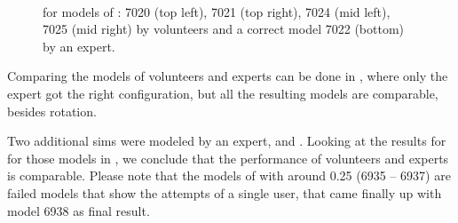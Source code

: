 \begin{figure}
  \centering
   \\
  \caption{\kenc for models of : 7020 (top left), 7021 (top right), 7024 (mid left), 7025 (mid right) by volunteers and a correct model 7022 (bottom) by an expert.}
  \label{fig:kapenc_compare_faulty}
\end{figure}

Comparing the models of volunteers and experts can be done in , where only the
expert got the right configuration, but all the resulting models are comparable, besides rotation.

Two additional sims were modeled by an expert,  and .
Looking at the results for \gEr for those models in , we conclude that the performance of volunteers and experts is comparable.
Please note that the models of  with  around 0.25 (6935 -- 6937) are failed models that show the attempts of a single user, that came finally up with model 6938 as final result.

\clearpage
